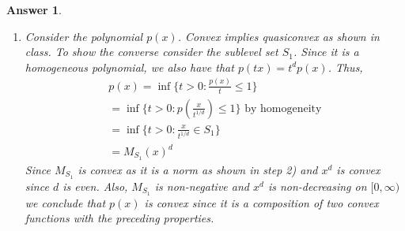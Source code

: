 \documentclass[12pt]{article}
\theoremstyle{colon}
\newtheorem*{answer}{Answer}
\begin{document}
\begin{answer}
\begin{enumerate}[label=\arabic*)]
\begin{itemize}
        \item (homogeneity) Suppose $M_C(x) = a$. Then $M_C(\alpha x) = \inf \{ t > 0 : \frac{\alpha x}{t} \in C \}$. By origin symmetry of $C$, if $\alpha < 0$, then $M_C(\alpha x) = \inf \{ t > 0 : \frac{- \alpha x}{t} \in C \}$. So we can consider $M_C(\alpha x) = \inf \{ t > 0 : \frac{\lvert \alpha \rvert x}{t} \in C \}$. We relabel $t' = \frac{t}{\lvert \alpha \rvert}$ to get $M_C(\alpha x) = \inf \{ t' > 0 : \frac{x}{t'} \in C \}$ and so we conclude that $\frac{M_C(\alpha x)}{\lvert \alpha \rvert} = a$ which means that $M_C(\alpha x) = \lvert \alpha \rvert M_C(x)$.

        \item (triangle inequality) We have by homogeneity of $M_C$ and convexity of $M_C$ that
          \begin{gather*}
            M_C(x + y) = M_C(2(\frac{1}{2} x + \frac{1}{2} y)) = 2 M_C(\frac{1}{2} x + \frac{1}{2} y) \leq M_C(x) + M_C(y)
          \end{gather*}

        Thus, $M_C$ is a norm if it is compact and origin symmetric with non-empty interior. Now we show what the unit ball is. Recall that $0 \in C$ since it is non-empty. By definition, $\frac{x}{M_C(x)} \in C$ since $C$ is compact (that is the infimum is achieved). Suppose that $M_C(x) \leq 1$. By convexity of $C$ we have
        \begin{gather*}
          x = M_C(x) \frac{x}{M_C(x)} + (1-M_C(x)) 0
        \end{gather*}
        But this is a convex combination of elements in $C$ and so $x \in C$. That is, if $M_C(x) \leq 1$ then $x \in C$. Also, if $x \in C$, then $M_C(x) \leq 1$ since $\frac{x}{1} = x \in C$. Thus, the unit ball is precisely $C$.
      \end{itemize}

    \item Consider the polynomial $p(x)$. Convex implies quasiconvex as shown in class. To show the converse consider the sublevel set $S_1$. Since it is a homogeneous polynomial, we also have that $p(t x) = t^d p(x)$. Thus,
      \begin{gather*}
        p(x) = \inf \{ t > 0 : \frac{p(x)}{t} \leq 1 \} \\
        = \inf \{ t > 0 : p(\frac{x}{t^{1/d}}) \leq 1 \} \text{ by homogeneity} \\
        = \inf \{ t > 0 : \frac{x}{t^{1/d}} \in S_1 \} \\
        = M_{S_1}(x)^d
      \end{gather*}
      Since $M_{S_1}$ is convex as it is a norm as shown in step 2) and $x^d$ is convex since $d$ is even. Also, $M_{S_1}$ is non-negative and $x^d$ is non-decreasing on $[0,\infty)$ we conclude that $p(x)$ is convex since it is a composition of two convex functions with the preceding properties.
  \end{enumerate}
\end{answer}
\end{document}

